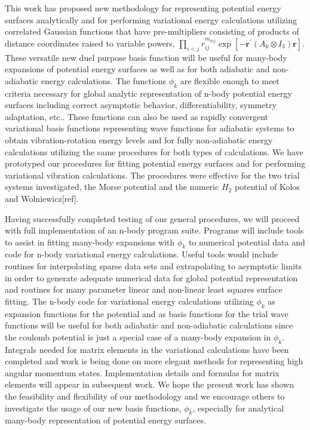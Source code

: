 \documentclass[12pt,thmsa]{article}
\begin{document}
This work has proposed new methodology for representing potential energy
surfaces analytically and for performing variational energy calculations
utilizing correlated Gaussian functions that have pre-multipliers consisting
of products of distance coordinates raised to variable powers, $%
\prod_{i<j}r_{ij}^{m_{kij}}\exp \left[ -\mathbf{r}^{\prime }(A_k\otimes I_3)%
\mathbf{r}\right] $. These versatile new duel purpose basis function will be
useful for many-body expansions of potential energy surfaces as well as for
both adiabatic and non-adiabatic energy calculations. The functions $\phi _k$
are flexible enough to meet criteria necessary for global analytic
representation of n-body potential energy surfaces including correct
asymptotic behavior, differentiability, symmetry adaptation, etc.. These
functions can also be used as rapidly convergent variational basis functions
representing wave functions for adiabatic systems to obtain
vibration-rotation energy levels and for fully non-adiabatic energy
calculations utilizing the same procedures for both types of calculations.
We have prototyped our procedures for fitting potential energy surfaces and
for performing variational vibration calculations. The procedures were
effective for the two trial systems investigated, the Morse potential and
the numeric $H_2$ potential of Kolos and Wolniewicz[ref].

Having successfully completed testing of our general procedures, we will
proceed with full implementation of an n-body program suite. Programs will
include tools to assist in fitting many-body expansions with $\phi _k$ to
numerical potential data and code for n-body variational energy
calculations. Useful tools would include routines for interpolating sparse
data sets and extrapolating to asymptotic limits in order to generate
adequate numerical data for global potential representation and routines for
many parameter linear and non-linear least squares surface fitting. The
n-body code for variational energy calculations utilizing $\phi _k$ as
expansion functions for the potential and as basis functions for the trial
wave functions will be useful for both adiabatic and non-adiabatic
calculations since the coulomb potential is just a special case of a
many-body expansion in $\phi _k$. Integrals needed for matrix elements in
the variational calculations have been completed and work is being done on
more elegant methods for representing high angular momentum states.
Implementation details and formulas for matrix elements will appear in
subsequent work. We hope the present work has shown the feasibility and
flexibility of our methodology and we encourage others to investigate the
usage of our new basis functions, $\phi _k$, especially for analytical
many-body representation of potential energy surfaces.



\end{document}
